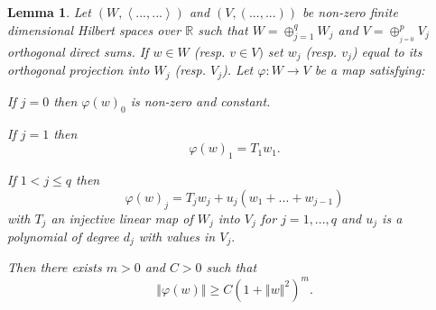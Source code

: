 \documentclass[12pt]{article}%
\newtheorem{lemma}[theorem]{Lemma}
\begin{document}
\begin{lemma}
\label{MyInequality}Let $\left(  W,\left\langle ...,...\right\rangle \right)
$ and $(V,(...,...))$ be non-zero finite dimensional Hilbert spaces over
$\mathbb{R}$ such that $W=\oplus_{j=1}^{q}W_{j}$ and $V=\oplus_{_{j=0}}%
^{p}V_{j}$ orthogonal direct sums. If $w\in W$ (resp. $v\in V)$ set $w_{j}$
(resp. $v_{j}$) equal to its orthogonal projection into $W_{j}$ (resp. $V_{j}%
$). Let $\varphi:W\rightarrow V$ be a map satisfying:

If $j=0$ then $\varphi(w)_{0}$ is non-zero and constant.

If $j=1$ then%
\[
\varphi(w)_{1}=T_{1}w_{1}\text{.}
\]


If $1<j\leq q$ then%
\[
\varphi(w)_{j}=T_{j}w_{j}+u_{j}(w_{1}+...+w_{j-1})
\]
with $T_{j}$ an injective linear map of $W_{j}$ into $V_{j}$ for $j=1,...,q$
and $u_{j}$ is a polynomial of degree $d_{j}$ with values in $V_{j}.$

Then there exists $m>0$ and $C>0$ such that
\[
\left\Vert \varphi(w)\right\Vert \geq C(1+\left\Vert w\right\Vert ^{2})^{m}.
\]

\end{lemma}
\end{document}
